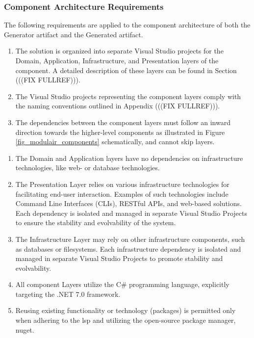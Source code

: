 \subsubsection{Component Architecture Requirements} \label{component_requirements}

The following requirements are applied to the component architecture of both the Generator
artifact and the Generated artifact.

\begin{enumerate}[label=\themycounter.\arabic*]
    \item The solution is organized into separate Visual Studio projects for the Domain,
    Application, Infrastructure, and Presentation layers of the component. A detailed
    description of these layers can be found in Section (((FIX FULLREF))).
    \item The Visual Studio projects representing the component layers comply with the naming
    conventions outlined in Appendix (((FIX FULLREF))).
    \item The dependencies between the component layers must follow an inward direction towards
    the higher-level components as illustrated in Figure \ref{fig_modulair_components}
    schematically, and cannot skip layers.
\end{enumerate}

\begin{enumerate}[label=\themycounter.\arabic*]
    \item The Domain and Application layers have no dependencies on infrastructure technologies, like web- or
    database technologies.
    \item The Presentation Layer relies on various infrastructure technologies for
    facilitating end-user interaction. Examples of such technologies include Command
    Line Interfaces (CLIs), RESTful APIs, and web-based solutions. Each dependency is
    isolated and managed in separate Visual Studio Projects to ensure the stability and
    evolvability of the system.
    \item The Infrastructure Layer may rely on other infrastructure components, such as
    databases or filesystems. Each infrastructure dependency is isolated and managed in
    separate Visual Studio Projects to promote stability and evolvability.
    \item All component Layers utilize the C\# programming language, explicitly targeting the
    .NET 7.0 framework.
    \item Reusing existing functionality or technology (packages) is permitted only when
    adhering to the \gls{lsp} and utilizing the open-source package manager,
    \gls{nuget}.
\end{enumerate}
